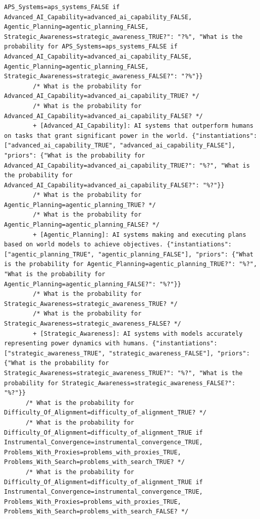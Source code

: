 \documentclass[
  11pt,
  letterpaper,
]{book}
\begin{document}
\begin{landscape}
\begin{verbatim}
APS_Systems=aps_systems_FALSE if Advanced_AI_Capability=advanced_ai_capability_FALSE, Agentic_Planning=agentic_planning_FALSE, Strategic_Awareness=strategic_awareness_TRUE?": "?%", "What is the probability for APS_Systems=aps_systems_FALSE if Advanced_AI_Capability=advanced_ai_capability_FALSE, Agentic_Planning=agentic_planning_FALSE, Strategic_Awareness=strategic_awareness_FALSE?": "?%"}}
        /* What is the probability for Advanced_AI_Capability=advanced_ai_capability_TRUE? */
        /* What is the probability for Advanced_AI_Capability=advanced_ai_capability_FALSE? */
        + [Advanced_AI_Capability]: AI systems that outperform humans on tasks that grant significant power in the world. {"instantiations": ["advanced_ai_capability_TRUE", "advanced_ai_capability_FALSE"], "priors": {"What is the probability for Advanced_AI_Capability=advanced_ai_capability_TRUE?": "%?", "What is the probability for Advanced_AI_Capability=advanced_ai_capability_FALSE?": "%?"}}
        /* What is the probability for Agentic_Planning=agentic_planning_TRUE? */
        /* What is the probability for Agentic_Planning=agentic_planning_FALSE? */
        + [Agentic_Planning]: AI systems making and executing plans based on world models to achieve objectives. {"instantiations": ["agentic_planning_TRUE", "agentic_planning_FALSE"], "priors": {"What is the probability for Agentic_Planning=agentic_planning_TRUE?": "%?", "What is the probability for Agentic_Planning=agentic_planning_FALSE?": "%?"}}
        /* What is the probability for Strategic_Awareness=strategic_awareness_TRUE? */
        /* What is the probability for Strategic_Awareness=strategic_awareness_FALSE? */
        + [Strategic_Awareness]: AI systems with models accurately representing power dynamics with humans. {"instantiations": ["strategic_awareness_TRUE", "strategic_awareness_FALSE"], "priors": {"What is the probability for Strategic_Awareness=strategic_awareness_TRUE?": "%?", "What is the probability for Strategic_Awareness=strategic_awareness_FALSE?": "%?"}}
      /* What is the probability for Difficulty_Of_Alignment=difficulty_of_alignment_TRUE? */
      /* What is the probability for Difficulty_Of_Alignment=difficulty_of_alignment_TRUE if Instrumental_Convergence=instrumental_convergence_TRUE, Problems_With_Proxies=problems_with_proxies_TRUE, Problems_With_Search=problems_with_search_TRUE? */
      /* What is the probability for Difficulty_Of_Alignment=difficulty_of_alignment_TRUE if Instrumental_Convergence=instrumental_convergence_TRUE, Problems_With_Proxies=problems_with_proxies_TRUE, Problems_With_Search=problems_with_search_FALSE? */

\end{verbatim}
\end{landscape}
\end{document}
